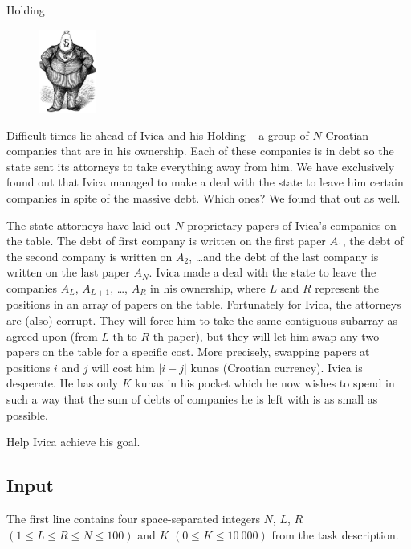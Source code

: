 \begin{statement}[
  problempoints=110,
  timelimit=2 seconds,
  memorylimit=512 MiB,
]{Holding}

\setlength\intextsep{-0.1cm}
\begin{figure}
\centering
\includegraphics[width=0.17\textwidth]{img/holding.png}
\end{figure}

Difficult times lie ahead of Ivica and his Holding -- a group of $N$ Croatian
companies that are in his ownership. Each of these companies is in debt so the
state sent its attorneys to take everything away from him. We have exclusively
found out that Ivica managed to make a deal with the state to leave him certain
companies in spite of the massive debt. Which ones? We found that out as well.

The state attorneys have laid out $N$ proprietary papers of Ivica's companies
on the table.  The debt of first company is written on the first paper $A_1$,
the debt of the second company is written on $A_2$, \dots and the debt of the
last company is written on the last paper $A_N$. Ivica made a deal with the
state to leave the companies $A_L$, $A_{L+1}$, \dots , $A_R$ in his
ownership, where $L$ and $R$ represent the positions in an array of papers on
the table.  Fortunately for Ivica, the attorneys are (also) corrupt. They
will force him to take the same contiguous subarray as agreed upon (from
$L$-th to $R$-th paper), but they will let him swap any two papers on the
table for a specific cost. More precisely, swapping papers at positions $i$
and $j$ will cost him $|i-j|$ kunas (Croatian currency).  Ivica is desperate.
He has only $K$ kunas in his pocket which he now wishes to spend in such a
way that the sum of debts of companies he is left with is as small as
possible.

Help Ivica achieve his goal.

\subsection*{Input}
The first line contains four space-separated integers $N$, $L$, $R$
$(1 \le L \le R \le N \le 100)$ and $K$ $(0 \le K \le 10\ 000)$ from the
task description.


\end{statement}
